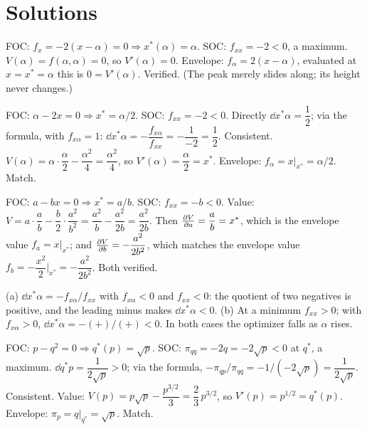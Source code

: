 \section{Solutions}

\begin{solutions}
  \item FOC: $f_x=-2(x-\alpha)=0\Rightarrow x^*(\alpha)=\alpha$. SOC:
        $f_{xx}=-2<0$, a maximum. $V(\alpha)=f(\alpha,\alpha)=0$, so
        $V'(\alpha)=0$. Envelope: $f_\alpha=2(x-\alpha)$, evaluated at
        $x=x^*=\alpha$ this is $0=V'(\alpha)$. Verified. (The peak
        merely slides along; its height never changes.)

  \item FOC: $\alpha-2x=0\Rightarrow x^*=\alpha/2$. SOC: $f_{xx}=-2<0$.
        Directly $\dd{x^*}{\alpha}=\dfrac12$; via the formula, with
        $f_{x\alpha}=1$:
        $\dd{x^*}{\alpha}=-\dfrac{f_{x\alpha}}{f_{xx}}
        =-\dfrac{1}{-2}=\dfrac12$. Consistent.
        $V(\alpha)=\alpha\cdot\dfrac{\alpha}{2}-\dfrac{\alpha^2}{4}
        =\dfrac{\alpha^2}{4}$, so $V'(\alpha)=\dfrac{\alpha}{2}=x^*$.
        Envelope: $f_\alpha=x\big|_{x^*}=\alpha/2$. Match.

  \item FOC: $a-bx=0\Rightarrow x^*=a/b$. SOC: $f_{xx}=-b<0$. Value:
        $V=a\cdot\dfrac ab-\dfrac b2\cdot\dfrac{a^2}{b^2}
        =\dfrac{a^2}{b}-\dfrac{a^2}{2b}=\dfrac{a^2}{2b}$. Then
        $\frac{\partial V}{\partial a}=\dfrac ab=x^*$, which is the envelope value
        $f_a=x\big|_{x^*}$; and $\frac{\partial V}{\partial b}=-\dfrac{a^2}{2b^2}$, which
        matches the envelope value
        $f_b=-\dfrac{x^2}{2}\Big|_{x^*}=-\dfrac{a^2}{2b^2}$. Both
        verified.

  \item (a) $\dd{x^*}{\alpha}=-f_{x\alpha}/f_{xx}$ with
        $f_{x\alpha}<0$ and $f_{xx}<0$: the quotient of two negatives is
        positive, and the leading minus makes
        $\dd{x^*}{\alpha}<0$. (b) At a minimum $f_{xx}>0$; with
        $f_{x\alpha}>0$, $\dd{x^*}{\alpha}=-(+)/(+)<0$. In both cases
        the optimizer falls as $\alpha$ rises.

  \item FOC: $p-q^2=0\Rightarrow q^*(p)=\sqrt{p}$. SOC:
        $\pi_{qq}=-2q=-2\sqrt{p}<0$ at $q^*$, a maximum.
        $\dd{q^*}{p}=\dfrac{1}{2\sqrt{p}}>0$; via the formula,
        $-\pi_{qp}/\pi_{qq}=-1/(-2\sqrt p)=\dfrac1{2\sqrt p}$.
        Consistent. Value:
        $V(p)=p\sqrt p-\dfrac{p^{3/2}}{3}=\dfrac23\,p^{3/2}$, so
        $V'(p)=p^{1/2}=q^*(p)$. Envelope:
        $\pi_p=q\big|_{q^*}=\sqrt p$. Match.


\end{solutions}
